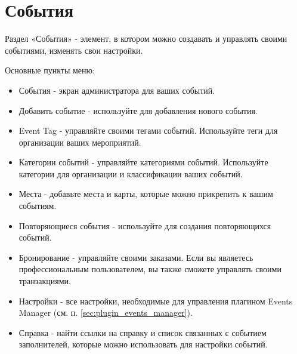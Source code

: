 \chapter{События}
\label{sec:chapter_events}

Раздел «События» - элемент, в котором можно создавать и управлять своими событиями, изменять свои настройки.

Основные пункты меню:
\begin{itemize}
\item События - экран администратора для ваших событий.
\item Добавить событие - используйте для добавления нового события.
\item Event Tag - управляйте своими тегами событий. Используйте теги для организации ваших мероприятий.
\item Категории событий - управляйте категориями событий. Используйте категории для организации и классификации ваших событий.
\item Места - добавьте места и карты, которые можно прикрепить к вашим событиям.
\item Повторяющиеся события - используйте для создания повторяющихся событий.
\item Бронирование - управляйте своими заказами. Если вы являетесь профессиональным пользователем, вы также сможете управлять своими транзакциями.
\item Настройки - все настройки, необходимые для управления плагином Events Manager (см. п. \ref{sec:plugin_events_manager}).
\item Справка - найти ссылки на справку и список связанных с событием заполнителей, которые можно использовать для настройки событий.
\end{itemize}
